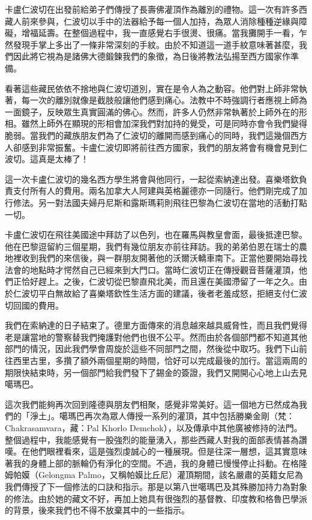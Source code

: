 卡盧仁波切在出發前給弟子們傳授了長壽佛灌頂作為離別的禮物。這一次有許多西藏人前來參與，仁波切以手中的法器給予每一個人加持，為眾人消除種種逆緣與障礙，增福延壽。在整個過程中，我一直感覺右手很燙、很痛。當我攤開手一看，乍然發現手掌上多出了一條非常深刻的手紋。由於不知道這一道手紋意味著甚麼，我們因此將它視為是諸佛大德鍛鍊我們的象徵，為日後將教法弘揚至西方國家作準備。

看著這些藏民依依不捨地與仁波切道別，實在是令人為之動容。他們對上師非常執著，每一次的離別就像是截肢般讓他們感到痛心。法教中不時強調行者應視上師為一面鏡子，反映眾生真實圓滿的佛心。然而，許多人仍然非常執著於上師外在的形相。雖然上師外在顯現的形相會加深我們對加持的覺受，可是同時亦會令我們變得脆弱。當我們的藏族朋友們為了仁波切的離開而感到痛心的同時，我們這幾個西方人卻感到非常振奮。卡盧仁波切即將前往西方國家，我們的朋友將會有機會見到仁波切。這真是太棒了！

這一次卡盧仁波切的幾名西方學生將會與他同行，一起從索納達出發。喜樂塔欽負責支付所有人的費用。兩名加拿大人阿建與英格麗德亦一同隨行。他們剛完成了加行修法。另一對法國夫婦丹尼斯和露斯瑪莉則飛往巴黎為仁波切在當地的活動打點一切。

卡盧仁波切在飛往美國途中拜訪了以色列，也在羅馬與教皇會面，最後抵達巴黎。他在巴黎逗留約三個星期，我們有幾位朋友亦前往拜訪。我的弟弟伯恩在瑞士的農地裡收到我們的來信後，與一群朋友開著他的沃爾沃轎車南下。正當他要開始尋找法會的地點時才愕然自己已經來到大門口。當時仁波切正在傳授觀音菩薩灌頂，他們正恰好趕上。之後，仁波切從巴黎直飛北美，而且還在美國滯留了一年之久。由於仁波切平白無故給了喜樂塔欽性生活方面的建議，後者老羞成怒，拒絕支付仁波切回國的費用。

我們在索納達的日子結束了。德里方面傳來的消息越來越具威脅性，而且我們覺得老是讓當地的警察替我們掩護對他們也很不公平。然而由於各個部門都不知道其他部門的情況，因此我們學會周旋於這些不同部門之間，然後從中取巧。我們下山前往西里古里，多攢了額外兩個星期的時間，恰好可以完成最後的加行。當這兩周的期限快結束時，另一個部門給我們發下了錫金的簽證，我們又開開心心地上山去見噶瑪巴。

這次我們能夠再次回到隆德與朋友們相聚，感覺非常美好。這一個地方已然成為我們的「淨土」。噶瑪巴再次為眾人傳授一系列的灌頂，其中包括勝樂金剛（梵：Chakrasamvara，藏：Pal
Khorlo
Demchok），以及傳承中其他廣被修持的法門。整個過程中，我能感覺有一股強烈的能量湧入，那些西藏人對我的面部表情甚為讚嘆。在他們眼裡看來，這是強烈虔誠心的一種展現。但是往深一層想，這其實意味著我的身體上部的脈輪仍有淨化的空間。不過，我的身體已慢慢停止抖動。在格隆姆帕嫫（Gelongma
Palmo，又稱帕嫫比丘尼）灌頂期間，該名嚴肅的英籍女尼為我們傳授了下一個修法的口訣和指示。那是以第八世噶瑪巴及其殊勝加持力為對象的修法。由於她的藏文不好，再加上她具有很強烈的基督教、印度教和格魯巴學派的背景，後來我們也不得不放棄其中的一些指示。

